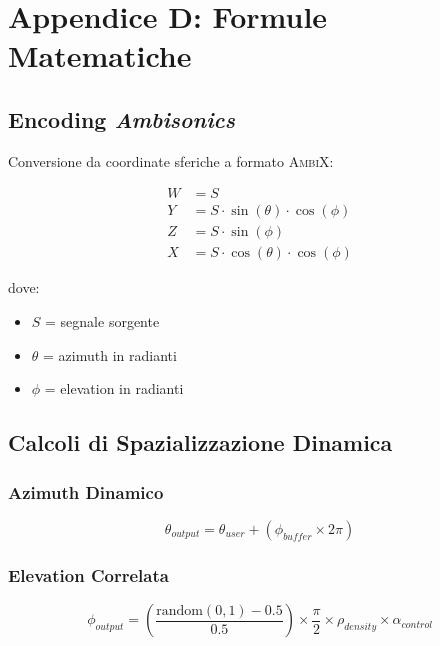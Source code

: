 \documentclass[a4paper,11pt,openany]{book}
\newcommand{\ambisonics}{\textit{Ambisonics}}
\newcommand{\ambix}{\textsc{AmbiX}}
\begin{document}
\section*{Appendice D: Formule Matematiche}

\subsection*{Encoding \ambisonics}

Conversione da coordinate sferiche a formato \ambix:

\begin{align}
W &= S \tag{Componente omnidirezionale} \\
Y &= S \cdot \sin(\theta) \cdot \cos(\phi) \tag{Sinistra-destra} \\
Z &= S \cdot \sin(\phi) \tag{Alto-basso} \\
X &= S \cdot \cos(\theta) \cdot \cos(\phi) \tag{Avanti-dietro}
\end{align}

dove:
\begin{itemize}
    \item $S$ = segnale sorgente
    \item $\theta$ = azimuth in radianti
    \item $\phi$ = elevation in radianti
\end{itemize}

\subsection*{Calcoli di Spazializzazione Dinamica}

\subsubsection*{Azimuth Dinamico}
\begin{equation}
\theta_{output} = \theta_{user} + (\phi_{buffer} \times 2\pi)
\end{equation}

\subsubsection*{Elevation Correlata}
\begin{equation}
\phi_{output} = \left(\frac{\text{random}(0,1) - 0.5}{0.5}\right) \times \frac{\pi}{2} \times \rho_{density} \times \alpha_{control}
\end{equation}
\end{document}
